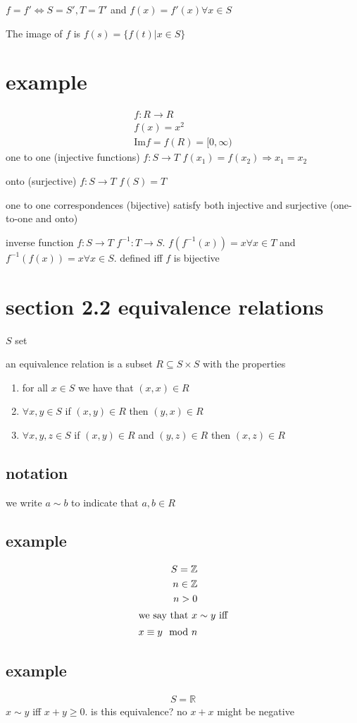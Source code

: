 \documentclass[letterpaper]{article}
\begin{document}
$f=f'\Leftrightarrow S=S',T=T'$ and $f(x)=f'(x)\forall x\in S$

The image of $f$ is $f(s)=\{f(t)|x\in S\}$

\section*{example}
\begin{align*}
  f:R\to R\\
  f(x)=x^2\\
  \text{Im} f=f(R)=[0,\infty)
\end{align*}
one to one (injective functions) $f:S\to T$ $f(x_1)=f(x_2)\Rightarrow x_1=x_2$

onto (surjective) $f:S\to T$ $f(S)=T$

one to one correspondences (bijective) satisfy both  injective and surjective (one-to-one and onto)

inverse function $f:S\to  T$ $f^{-1}:T\to S$. $f(f^{-1}(x))=x\forall x\in T$ and $f^{-1}(f(x))=x\forall x\in S$. defined iff $f$ is bijective
\section*{section 2.2 equivalence relations}
$S$ set

an equivalence relation is a subset $R\subseteq S\times S$ with the properties
\begin{enumerate}
\item
for all $x\in S$ we have that $(x,x)\in R$
\item
$\forall x,y\in S$ if $(x,y)\in R$ then $(y,x)\in R$
\item
$\forall x,y,z\in S$ if $(x,y)\in R$ and $(y,z)\in R$ then $(x,z)\in R$
\end{enumerate}
\subsection*{notation}
we write $a\sim{ }b$ to indicate that $a,b\in R$
\subsection*{example}
\begin{align*}
  S=\mathbb{Z}\\
  n\in\mathbb{Z}\\
  n>0\\
  \intertext{we say  that $x\sim y$ iff}
  x\equiv y\mod n
\end{align*}
\subsection*{example}
\begin{align*}
  S=\mathbb{R}
\end{align*}
$x\sim y$ iff $x+y\ge 0$. is this equivalence? no $x+x$ might be negative
\end{document}
